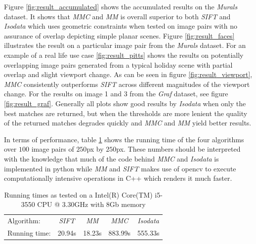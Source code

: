 \documentclass[12pt,journal]{IEEEtran}
\begin{document}
Figure \ref{fig:result_accumulated} shows the accumulated results on the 
\emph{Murals} dataset. It shows that \emph{MMC} and \emph{MM} is overall 
superior to both \emph{SIFT} and \emph{Isodata} which uses geometric 
constraints when tested on image pairs with no assurance of overlap 
depicting simple planar scenes. Figure \ref{fig:result_faces} 
illustrates the result on a particular image pair from the \emph{Murals} 
dataset. For an example of a real life use case \ref{fig:result_pitts} 
shows the results on potentially overlapping image pairs generated from 
a typical holiday scene with partial overlap and slight viewport 
change. As can be seen in figure \ref{fig:result_viewport}, \emph{MMC} 
consistently outperforms \emph{SIFT} across different magnitudes of the 
viewport change. For the results on image 1 and 3 from the \emph{Graf} 
dataset, see figure \ref{fig:result_graf}.
Generally all plots show good results by \emph{Isodata} when only the 
best matches are returned, but when the thresholds are more lenient the 
quality of the returned matches degrades quickly and \emph{MMC} and 
\emph{MM} yield better results.

In terms of performance, table \ref{table:running_times} shows the 
running time of the four algorithms over $100$ image pairs of $250$px by 
$250$px. These numbers should be interpreted with the knowledge that 
much of the code behind \emph{MMC} and \emph{Isodata} is implemented in 
python while \emph{MM} and \emph{SIFT} makes use of opencv to execute 
computationally intensive operations in C++ which renders it much 
faster.
%
\begin{savenotes}
\begin{table}
	\centering
	\small
\begin{tabular}{l*{4}{c}}
	Algorithm: & \emph{SIFT} & \emph{MM} & \emph{MMC} & \emph{Isodata} 
	\\
	\noalign{\smallskip} 
	Running time: & 20.94s & 18.23s & 883.99s & 555.33s \\
\end{tabular}
\caption{Running times as tested on a Intel(R) Core(TM) i5-3550 CPU @ 
3.30GHz with 8Gb memory}
\label{table:running_times}
\end{table}
\end{savenotes}
%
\end{document}
